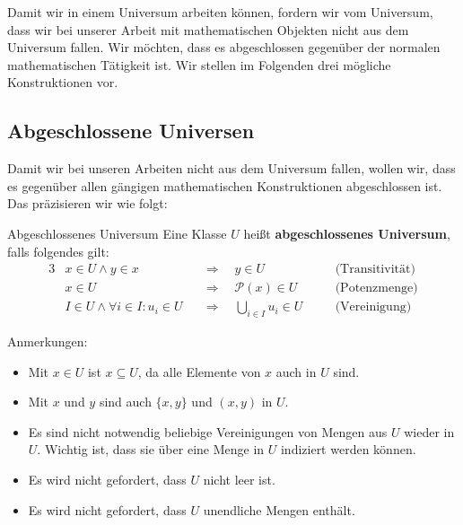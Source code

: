 \documentclass[a4paper]{amsart}
\theoremstyle{definition}
\newcommand{\PP}{\ensuremath{\mathcal{ P }}}
\begin{document}
Damit wir in einem Universum arbeiten können, fordern wir vom Universum, dass wir bei unserer Arbeit mit mathematischen Objekten nicht aus dem Universum fallen. Wir möchten, dass es abgeschlossen gegenüber der normalen mathematischen Tätigkeit ist. Wir stellen im Folgenden drei mögliche Konstruktionen vor.

\subsection{Abgeschlossene Universen}
Damit wir bei unseren Arbeiten nicht aus dem Universum fallen, wollen wir, dass es gegenüber allen gängigen mathematischen Konstruktionen abgeschlossen ist. Das präzisieren wir wie folgt:
\begin{Definition}{Abgeschlossenes Universum}
   Eine Klasse $U$ heißt \textbf{abgeschlossenes Universum}, falls folgendes gilt:
   \begin{alignat}{3}
      &x \in U \land y \in x       &&\Rightarrow \quad y \in U      && \quad \text{(Transitivität)}\\
      &x \in U                     &&\Rightarrow \quad \PP(x) \in U && \quad \text{(Potenzmenge)}\\
      &I \in U \land \forall 
          i \in I \colon u_i \in U &&\Rightarrow \quad \bigcup_{i\in I} u_i \in U 
                                                               && \quad \text{(Vereinigung)}
   \end{alignat}
\end{Definition}
Anmerkungen:
\begin{itemize}
   \item Mit $x \in U$ ist $x \subseteq U$, da alle Elemente von $x$ auch in $U$ sind.
   \item Mit $x$ und $y$ sind auch $\{x, y\}$ und $(x,y)$ in $U$.
   \item Es sind nicht notwendig beliebige Vereinigungen von Mengen aus $U$ wieder in $U$. Wichtig ist, dass sie über eine Menge in $U$ indiziert werden können.
   \item Es wird nicht gefordert, dass $U$ nicht leer ist.
   \item Es wird nicht gefordert, dass $U$ unendliche Mengen enthält.
\end{itemize}

\end{document}
